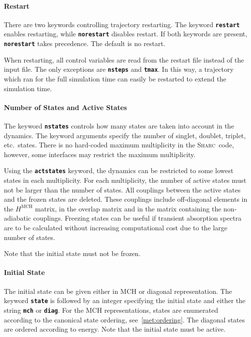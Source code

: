\documentclass[a4paper,11pt,DIV=15,openany,twoside=false]{scrbook}
\newcommand{\sharc}{\textsc{Sharc}}
\newcommand{\ttt}[1]{\textbf{\texttt{#1}}}
\begin{document}
\paragraph{Restart}

There are two keywords controlling trajectory restarting. The keyword \ttt{restart} enables restarting, while \ttt{norestart} disables restart. If both keywords are present, \ttt{norestart} takes precedence. The default is no restart.

When restarting, all control variables are read from the restart file instead of the input file. The only exceptions are \ttt{nsteps} and \ttt{tmax}. In this way, a trajectory which ran for the full simulation time can easily be restarted to extend the simulation time.

\paragraph{Number of States and Active States}

The keyword \ttt{nstates} controls how many states are taken into account in the dynamics. The keyword arguments specify the number of singlet, doublet, triplet, etc.\ states. There is no hard-coded maximum multiplicity in the \sharc\ code, however, some interfaces may restrict the maximum multiplicity. 

Using the \ttt{actstates} keyword, the dynamics can be restricted to some lowest states in each multiplicity. For each multiplicity, the number of active states must not be larger than the number of states. All couplings between the active states and the frozen states are deleted. These couplings include off-diagonal elements in the $H^{\text{MCH}}$ matrix, in the overlap matrix and in the matrix containing the non-adiabatic couplings. Freezing states can be useful if transient absorption spectra are to be calculated without increasing computational cost due to the large number of states.

Note that the initial state must not be frozen.

\paragraph{Initial State}

The initial state can be given either in MCH or diagonal representation. The keyword \ttt{state} is followed by an integer specifying the initial state and either the string \ttt{mch} or \ttt{diag}. For the MCH representations, states are enumerated according to the canonical state ordering, see~\ref{met:ordering}. The diagonal states are ordered according to energy. Note that the initial state must be active. 
\end{document}
